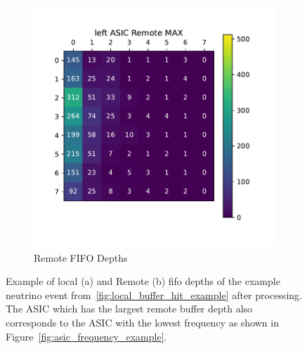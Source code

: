 \begin{figure}
\begin{subfigure}{.5\textwidth}
  \includegraphics[width=\textwidth]{images/left_asic_remote.pdf}
  \caption{Remote FIFO Depths}
\end{subfigure}
\caption{Example of local (a) and Remote (b) fifo depths of the example neutrino event from~\ref{fig:local_buffer_hit_example} after processing.
 The ASIC which has the largest remote buffer depth also corresponds to the ASIC with the lowest frequency as shown in Figure~\ref{fig:asic_frequency_example}.}
\label{fig:left_example_neutrino}
\end{figure}

